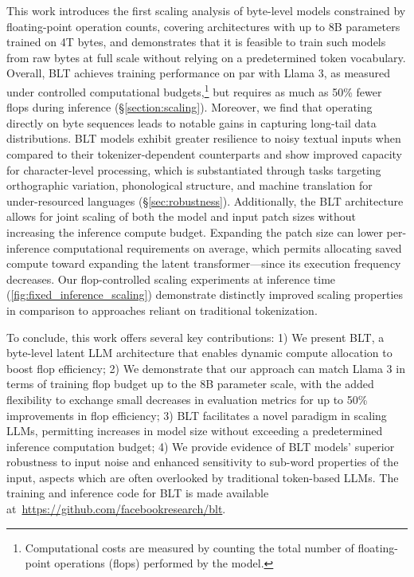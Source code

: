 This work introduces the first scaling analysis of byte-level models constrained by floating-point operation counts, covering architectures with up to 8B parameters trained on 4T bytes, and demonstrates that it is feasible to train such models from raw bytes at full scale without relying on a predetermined token vocabulary. Overall, {\textsc BLT} achieves training performance on par with Llama 3, as measured under controlled computational budgets,\footnote{Computational costs are measured by counting the total number of floating-point operations (flops) performed by the model.} but requires as much as 50\% fewer flops during inference (\S\ref{section:scaling}).
Moreover, we find that operating directly on byte sequences leads to notable gains in capturing long-tail data distributions. {\textsc BLT} models exhibit greater resilience to noisy textual inputs when compared to their tokenizer-dependent counterparts and show improved capacity for character-level processing, which is substantiated through tasks targeting orthographic variation, phonological structure, and machine translation for under-resourced languages (\S\ref{sec:robustness}).
Additionally, the {\textsc BLT} architecture allows for joint scaling of both the model and input patch sizes without increasing the inference compute budget. Expanding the patch size can lower per-inference computational requirements on average, which permits allocating saved compute toward expanding the latent transformer—since its execution frequency decreases. Our flop-controlled scaling experiments at inference time (\autoref{fig:fixed_inference_scaling}) demonstrate distinctly improved scaling properties in comparison to approaches reliant on traditional tokenization.

To conclude, this work offers several key contributions: 1) We present {\textsc BLT}, a byte-level latent LLM architecture that enables dynamic compute allocation to boost flop efficiency; 2) We demonstrate that our approach can match Llama 3 in terms of training flop budget up to the 8B parameter scale, with the added flexibility to exchange small decreases in evaluation metrics for up to 50\% improvements in flop efficiency; 3) {\textsc BLT} facilitates a novel paradigm in scaling LLMs, permitting increases in model size without exceeding a predetermined inference computation budget; 4) We provide evidence of {\textsc BLT} models’ superior robustness to input noise and enhanced sensitivity to sub-word properties of the input, aspects which are often overlooked by traditional token-based LLMs. The training and inference code for {\textsc BLT} is made available at~\url{https://github.com/facebookresearch/blt}.

